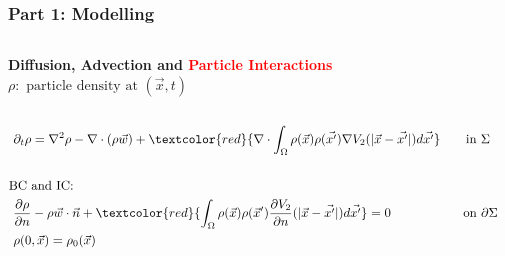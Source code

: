 \documentclass[aspectratio=169,xcolor=dvipsnames]{beamer}
\begin{document}
\begin{frame}
	\frametitle{Part 1: Modelling}
	\begin{columns}
		\textbf{Diffusion, Advection and \textcolor{red}{Particle Interactions}}
		$	\rho: \text{ particle density at } (\vec{x},t)$
		\begin{align*}
		\\
		\partial_t \rho &= \nabla^2 \rho - \nabla \cdot (\rho \vec{w}) +\textcolor{red}{ \nabla \cdot \int_\Omega \rho(\vec{x}) \rho(\vec{x'}) \nabla V_2(|\vec{x}-\vec{x'}|)d\vec{x'}} \qquad\text{in    } \Sigma\\
		\\
		\text{BC }& \text{and IC:}\\
		\frac{\partial \rho}{\partial n}& - \rho \vec{w} \cdot \vec{n} +\textcolor{red}{ \int_\Omega \rho(\vec{x}) \rho(\vec{x}')  \frac{ \partial  V_2}{\partial n}(|\vec{x}-\vec{x'}|)d\vec{x'}} = 0 \quad\ \ \qquad \qquad\text{on   } \partial \Sigma   \\
		\rho(0&,\vec{x}) = \rho_0(\vec{x}) 
		\end{align*}
		\vspace{-1cm}
		\begin{figure}
			\includegraphics[width=3cm]{bloodcells.jpg}\\
			\includegraphics[width=3cm]{bacteria.png}\\
			\includegraphics[width=3cm]{Microfilter.png}\\
			\includegraphics[width=3cm]{beer.png}
		\end{figure}
	\end{columns}
\end{frame}
\end{document}
